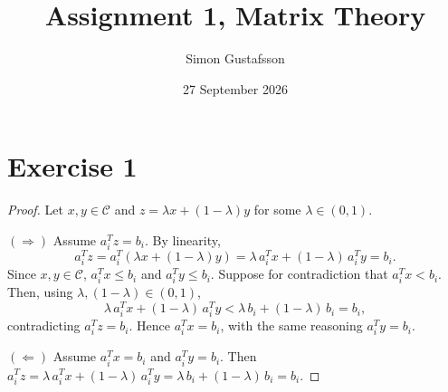 \documentclass[12pt]{article}
\title{Assignment 1, Matrix Theory}
\author{Simon Gustafsson}
\date{27 September 2026}
\begin{document}
\maketitle

\section*{Exercise 1}

\begin{proof}
Let $x, y \in \mathcal{C}$ and $z = \lambda x + (1-\lambda)y$ for some $\lambda \in (0,1)$.

\medskip
\noindent $(\Rightarrow)$ Assume $a_i^T z = b_i$. By linearity,
\[
a_i^T z = a_i^T(\lambda x + (1-\lambda)y) = \lambda\, a_i^T x + (1-\lambda)\, a_i^T y = b_i.
\]
Since $x, y \in \mathcal{C}$, $a_i^T x \leq b_i$ and $a_i^T y \leq b_i$. 
Suppose for contradiction that $a_i^T x < b_i$. Then, using $\lambda,(1 - \lambda) \in (0, 1)$,
\[
\lambda\, a_i^T x + (1-\lambda)\, a_i^T y < \lambda\, b_i + (1-\lambda)\, b_i = b_i,
\]
contradicting $a_i^T z = b_i$. Hence $a_i^T x = b_i$, with the same reasoning $a_i^T y = b_i$.

\medskip
\noindent $(\Leftarrow)$ Assume $a_i^T x = b_i$ and $a_i^T y = b_i$. Then $a_i^T z = \lambda\, a_i^T x + (1-\lambda)\, a_i^T y = \lambda\, b_i + (1-\lambda)\, b_i = b_i$.

\end{proof}
\end{document}
